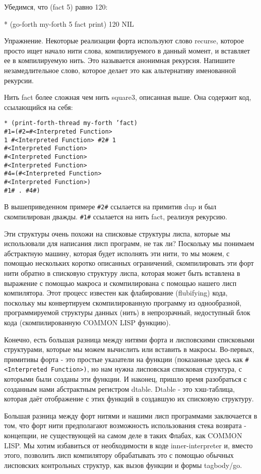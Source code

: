 {{{Убедимся, что (fact 5) равно 120:

* (go-forth my-forth
5 fact print)
120
NIL

Упражнение. Некоторые реализации форта используют слово recurse, которое просто ищет начало нити слова, компилируемого в данный момент, и вставляет ее в компилируемую нить. Это называется анонимная рекурсия. Напишите незамедлительное слово, которое делает это как альтернативу именованной рекурсии.

Нить fact более сложная чем нить square3, описанная выше. Она содержит код, ссылающийся на себя:

\begin{verbatim}
* (print-forth-thread my-forth ’fact)
#1=(#2=#<Interpreted Function>
1 #<Interpreted Function> #2# 1
#<Interpreted Function>
#<Interpreted Function>
#<Interpreted Function>
#4=(#<Interpreted Function>
#<Interpreted Function>)
#1# . #4#)
\end{verbatim}

В вышеприведенном примере \verb|#2#| ссылается на примитив dup и был скомпилирован дважды. \verb|#1#| ссылается на нить fact, реализуя рекурсию.

Эти структуры очень похожи на списковые структуры лиспа, которые мы использовали для написания лисп программ, не так ли? Поскольку мы понимаем абстрактную машину, которая будет исполнять эти нити, то мы можем, с помощью нескольких коротко описанных ограничений, скомпилировать эти форт нити обратно в списковую структуру лиспа, которая может быть вставлена в выражение с помощью макроса и скомпилирована с помощью нашего лисп компилятора. Этот процесс известен как флабирование (flubifying) кода, поскольку мы конвертируем скомпилированную программу из однообразной, программируемой структуры данных (нить) в непрозрачный, недоступный блок кода (скомпилированную COMMON LISP функцию).

Конечно, есть большая разница между нитями форта и лисповскими списковыми структурами, которые мы можем вычислить или вставить в макросы. Во-первых, примитивы форта - это простые указатели на функции (показанные здесь как \verb|#<Interpreted Function>)|, но нам нужна лисповская списковая структура, с которыми были созданы эти функции. И наконец, пришло время разобраться с созданным нами абстрактным регистром dtable. Dtable - это хэш-таблица, которая даёт отображение с этих функций в создавшую их списковую структуру.

Большая разница между форт нитями и нашими лисп программами заключается в том, что форт нити предполагают возможность использования стека возврата - концепции, не существующей на самом деле в таких Флабах, как COMMON LISP. Мы хотим избавиться от необходимости в коде inner-interpreter и, вместо этого, позволить лисп компилятору обрабатывать это с помощью обычных лисповских контрольных структур, как вызов функции и формы tagbody/go.

}}}
